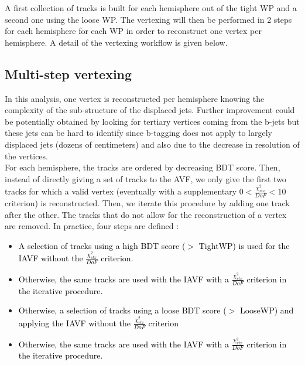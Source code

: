 \documentclass{cernatlasnote}
\begin{document}
     A first collection of tracks is built for each hemisphere out of the tight WP and a second one using the loose WP. The vertexing will then be performed in 2 steps for each hemisphere for each WP in order to reconstruct one vertex per hemisphere. A detail of the vertexing workflow is given below.
    
    \subsection{Multi-step vertexing}
        In this analysis, one vertex is reconstructed per hemisphere knowing the complexity of the sub-structure of the displaced jets. Further improvement could be potentially obtained by looking for tertiary vertices coming from the b-jets but these jets can be hard to identify since b-tagging does not apply to largely displaced jets (dozens of centimeters) and also due to the decrease in resolution of the vertices.\\

        For each hemisphere, the tracks are ordered by decreasing BDT score. Then, instead of directly giving a set of tracks to the AVF, we only give the first two tracks for which a valid vertex (eventually with a supplementary 0$<\frac{\chi^2_{vtx}}{DoF}<$10 criterion) is reconstructed. Then, we iterate this procedure by adding one track after the other. The tracks that do not allow for the reconstruction of a vertex are removed. In practice, four steps are defined :
    \begin{itemize}
        \item \textcolor{black}{ A selection of tracks using a high BDT score ($>$ TightWP) is used for the IAVF without the $\frac{\chi^2_{vtx}}{DoF}$ criterion.}
        \item \textcolor{black}{ Otherwise, the same tracks are used with the IAVF with a $\frac{\chi^2_{vtx}}{DoF}$ criterion in the iterative procedure.}
        \item \textcolor{black}{ Otherwise, a selection of tracks using a loose BDT score ($>$ LooseWP) and applying the IAVF without the $\frac{\chi^2_{vtx}}{DoF}$ criterion}
        \item  \textcolor{black}{ Otherwise, the same tracks are used with the IAVF with a $\frac{\chi^2_{vtx}}{DoF}$ criterion in the iterative procedure.}
    \end{itemize}
\end{document}
